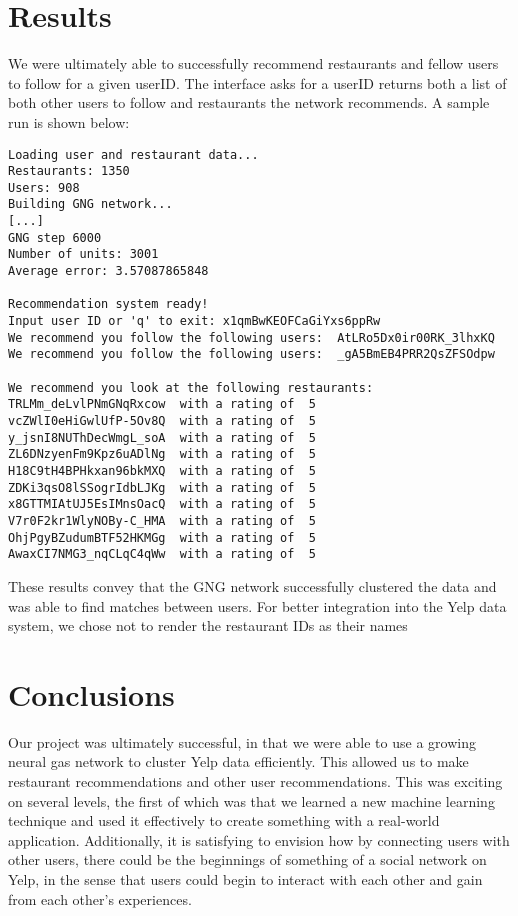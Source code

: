 \documentclass[12pt,letterpaper]{article}
\begin{document}
\section{Results}

We were ultimately able to successfully recommend restaurants and fellow users to follow for a given userID. The interface asks for a userID returns both a list of both other users to follow and restaurants the network recommends. A sample run is shown below: \\

\begin{verbatim}
Loading user and restaurant data...
Restaurants: 1350
Users: 908
Building GNG network...
[...]
GNG step 6000
Number of units: 3001
Average error: 3.57087865848

Recommendation system ready!
Input user ID or 'q' to exit: x1qmBwKEOFCaGiYxs6ppRw
We recommend you follow the following users:  AtLRo5Dx0ir00RK_3lhxKQ
We recommend you follow the following users:  _gA5BmEB4PRR2QsZFSOdpw

We recommend you look at the following restaurants: 
TRLMm_deLvlPNmGNqRxcow  with a rating of  5
vcZWlI0eHiGwlUfP-5Ov8Q  with a rating of  5
y_jsnI8NUThDecWmgL_soA  with a rating of  5
ZL6DNzyenFm9Kpz6uADlNg  with a rating of  5
H18C9tH4BPHkxan96bkMXQ  with a rating of  5
ZDKi3qsO8lSSogrIdbLJKg  with a rating of  5
x8GTTMIAtUJ5EsIMnsOacQ  with a rating of  5
V7r0F2kr1WlyNOBy-C_HMA  with a rating of  5
OhjPgyBZudumBTF52HKMGg  with a rating of  5
AwaxCI7NMG3_nqCLqC4qWw  with a rating of  5
\end{verbatim}

These results convey that the GNG network successfully clustered the data and was able to find matches between users. For better integration into the Yelp data system, we chose not to render the restaurant IDs as their names 

\section{Conclusions}

Our project was ultimately successful, in that we were able to use a growing neural gas network to cluster Yelp data efficiently. This  allowed us to make restaurant recommendations and other user recommendations. This was exciting on several levels, the first of which was that we learned a new machine learning technique and used it effectively to create something with a real-world application. Additionally, it is satisfying to envision how by connecting users with other users, there could be the beginnings of something of a social network on Yelp, in the sense that users could begin to interact with each other and gain from each other's experiences. 


\balance
\end{document}
